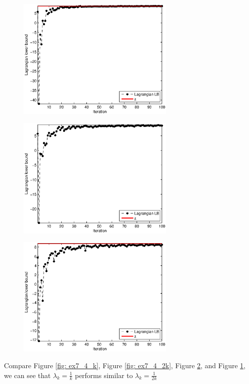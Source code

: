 \begin{figure}[!ht]
\centering
\begin{minipage}{0.49\textwidth}
\includegraphics[width=3.0in]{./p4/ex7_4_klogk}
\label{fig: ex7_4_klogk}
\end{minipage}
\end{figure}

\begin{figure}[!ht]
\centering
\begin{minipage}{0.49\textwidth}
\includegraphics[width=3.0in]{./p4/ex7_4_2k}
\label{fig: ex7_4_2k}
\end{minipage}
\begin{minipage}{0.49\textwidth}
\includegraphics[width=3.0in]{./p4/ex7_4_2k1}
\label{fig: ex7_4_2k1}
\end{minipage}
\end{figure}

Compare Figure \ref{fig: ex7_4_k}, Figure \ref{fig: ex7_4_2k}, Figure \ref{fig: ex7_4_2k1}, and Figure \ref{fig: ex7_4_klogk}, we can see that $\lambda_k=\frac{1}{k}$ performs similar to $\lambda_k=\frac{1}{2k}$